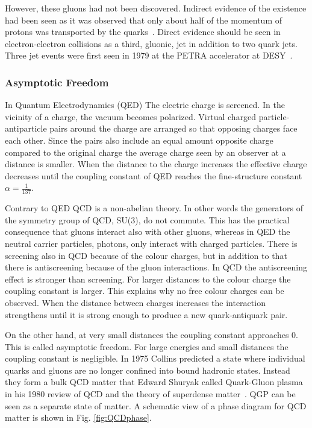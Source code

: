 However, these gluons had not been discovered. Indirect evidence of the existence had been seen 
 as it was observed that only about half of the momentum of protons was transported by the quarks~\cite{25gluons}. Direct evidence should be seen in electron-electron collisions as a third, gluonic, jet in addition to two quark jets. Three jet events were first seen in 1979 at the PETRA accelerator at DESY~\cite{Brandelik1979243, PhysRev.43.830, Berger1979418}.

\subsubsection{Asymptotic Freedom}
In Quantum Electrodynamics (QED) The electric charge is screened. In the vicinity of a charge, the vacuum becomes polarized. Virtual charged particle-antiparticle pairs around the charge are arranged so that opposing charges face each other. Since the pairs also include an equal amount opposite charge compared to the original charge the average charge seen by an observer at a distance is smaller. When the distance to the charge increases the effective charge decreases until the coupling constant of QED reaches the fine-structure constant $\alpha=\frac{1}{137}$. 

Contrary to QED QCD is a non-abelian theory. In other words the generators of the symmetry group of QCD, SU(3), do not commute. This has the practical consequence that gluons interact also with other gluons, whereas in QED the neutral carrier particles, photons, only interact with charged particles.
There is screening also in QCD because of the colour charges, but in addition to that there is antiscreening because of the gluon interactions. In QCD the antiscreening effect is stronger than screening. For larger distances to the colour charge the coupling constant is larger. This explains why no free colour charges can be observed. When the distance between charges increases the interaction strengthens until it is strong enough to produce a new quark-antiquark pair. 

On the other hand, at very small distances the coupling constant approaches 0. This is called asymptotic freedom. For large energies and small distances the coupling constant is negligible. In 1975 Collins\cite{Collins:1975} predicted a state where individual quarks and gluons are no longer confined into bound hadronic states. Instead they form a bulk QCD matter that Edward Shuryak called Quark-Gluon plasma in his 1980 review of QCD and the theory of superdense matter~\cite{Shuryak:1980}. QGP can be seen as a separate state of matter. A schematic view of a phase diagram for QCD matter is shown in Fig. \ref{fig:QCDphase}. 

